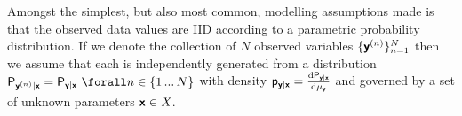 Amongst the simplest, but also most common, modelling assumptions made is that the observed data values are \ac{IID} according to a parametric probability distribution. If we denote the collection of $N$ observed variables $\lbrace \boldsymbol{\mathsf{y}}^{(n)} \rbrace_{n=1}^N$ then we assume that each is independently generated from a distribution $\prob{\rvct{y}^{(n)}|\rvct{x}} = \prob{\rvct{y}|\rvct{x}} ~\forall n \in \lbrace 1 \,...\,N\rbrace$ with density $\mathsf{p}_{\boldsymbol{\mathsf{y}}|\boldsymbol{\mathsf{x}}} = \frac{\mathrm{d} \mathsf{P}_{\boldsymbol{\mathsf{y}}|\boldsymbol{\mathsf{x}}}}{\mathrm{d} \mu_{\boldsymbol{\mathsf{y}}}}$ and governed by a set of unknown parameters $\boldsymbol{\mathsf{x}} \in \mathit{X}$. %

